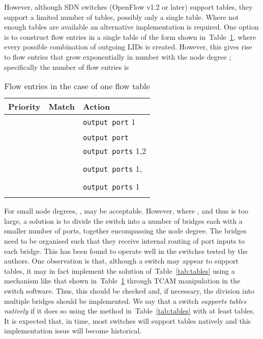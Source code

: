 \documentclass[conference]{IEEEtran}
\newcommand{\tabref}[1]{Table~\ref{#1}}
\begin{document}
However, although SDN switches (OpenFlow v1.2 or later) support tables, they support a limited number of tables, possibly only a single table. Where not enough tables are available an alternative implementation is required. One option is to construct flow entries in a single table of the form shown in~\tabref{tab:notables}, where every possible combination of outgoing LIDs is created. However, this gives rise to flow entries that grow exponentially in number with the node degree ; specifically the number of flow entries  is 

\begin{table}[tb]
  \centering
  \caption{Flow entries in the case of one flow table}
  \vspace{0.5em}
  \begin{tabular}{|l|l|l|}
    \hline
    Priority & Match & Action\\
    \hline
     &  & \texttt{output port} 1\\
    &  & \\
     &  & \texttt{output port} \\
     &  & \texttt{output ports} 1,2\\
    &  & \\
     &  & \texttt{output ports} 1,\\
    &  & \\
     &  & \texttt{output ports} 1\\
    & & \\
    \hline
  \end{tabular}
  \label{tab:notables}
\end{table}

For small node degrees, ,  may be acceptable. However, where , and thus  is too large, a solution is to divide the switch into a number of bridges each with a smaller number of ports, together encompassing the node degree. The bridges need to be organised such that they receive internal routing of port inputs to each bridge. This has been found to operate well in the switches tested by the authors. One observation is that, although a switch may appear to support tables, it may in fact implement the solution of~\tabref{tab:tables} using a mechanism like that shown in~\tabref{tab:notables} through TCAM manipulation in the switch software. Thus, this should be checked and, if necessary, the division into multiple bridges should be implemented. We say that a switch \emph{supports tables natively} if it does so using the method in~\tabref{tab:tables} with at least  tables. It is expected that, in time, most switches will support tables natively and this implementation issue will become historical.
\end{document}

